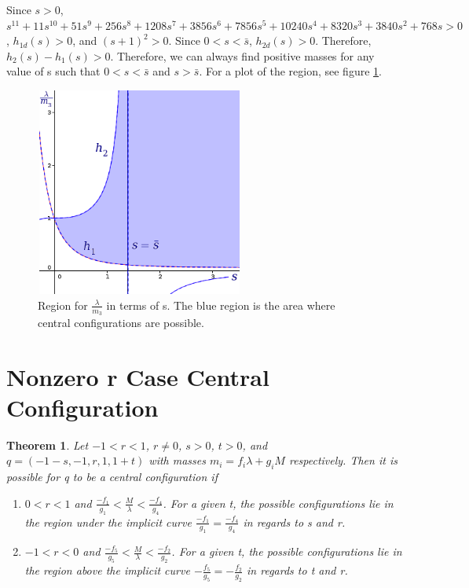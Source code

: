 \documentclass[11pt,leqno]{article}
\newtheorem{theorem}{Theorem}[section]
\theoremstyle{definition}
\theoremstyle{remark}
\numberwithin{equation}{section}
\begin{document}
Since $s>0$, $s^{11}+11s^{10}+51s^{9}+256s^{8}+1208s^{7}+3856s^{6}+7856s^{5}+10240s^{4}+8320s^{3}+3840s^{2}+768s>0$,
$h_{1d}(s)>0$, and $(s+1)^{2}>0$. Since $0<s<\bar{s}$, $h_{2d}(s)>0$.
Therefore, $h_{2}(s)-h_{1}(s)>0.$ Therefore, we can always find positive
masses for any value of s such that $0<s<\bar{s}$ and $s>\bar{s}$. For a plot of the region, see figure \ref{fig:SCG1}.

\begin{center}
\begin{figure}

\includegraphics[width=2.7in, height=2.7in]{Lm3RegionSpecialCase.png}
 \caption{Region for $\frac{\lambda}{m_3}$ in terms of s. The blue region is the area where central configurations are possible.  }
 \label{fig:SCG1}
\end{figure}
\end{center}


\section{Nonzero r Case Central Configuration}

\begin{theorem}
\label{thmsc}
\emph{Let $-1<r<1$, $r\neq0$, $s>0$, $t>0$, and $q=(-1-s,-1,r,1,1+t)$
with masses $m_{i}=f_{i}\lambda+g_{i}M$ respectively. Then it is possible for q to be a
central configuration if }
\begin{enumerate}
\item \emph{$0<r<1$ and $\frac{-f_{1}}{g_{1}}<\frac{M}{\lambda}<\frac{-f_{4}}{g_{4}}$.
For a given t, the possible configurations lie in the region under
the implicit curve $\frac{-f_{1}}{g_{1}}=\frac{-f_{4}}{g_{4}}$ in
regards to s and r.}
\item \emph{$-1<r<0$ and $\frac{-f_{5}}{g_{5}}<\frac{M}{\lambda}<\frac{-f_{2}}{g_{2}}$.
For a given t, the possible configurations lie in the region above
the implicit curve $-\frac{f_{5}}{g_{5}}=-\frac{f_{2}}{g_{2}}$ in
regards to t and r.}\end{enumerate}
\end{theorem}
\end{document}
